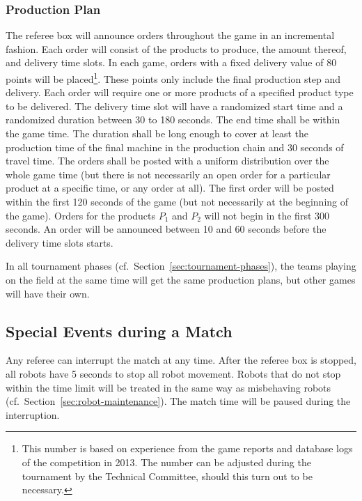 \documentclass[12pt,twoside]{article}
\newcommand{\refsec}[1]{Section~\ref{#1}}
\begin{document}
\subsubsection{Production Plan}
The referee box will announce orders throughout the game in an
incremental fashion. Each order will consist of the products to
produce, the amount thereof, and delivery time slots. In each game,
orders with a fixed delivery value of 80 points will be
placed\footnote{This number is based on experience from the game
  reports and database logs of the competition in 2013. The number can
  be adjusted during the tournament by the Technical Committee, should
  this turn out to be necessary.}. These points only include the
final production step and delivery. Each order will require one or
more products of a specified product type to be delivered. The
delivery time slot will have a randomized start time and a randomized
duration between 30 to 180 seconds. The end time shall be within the
game time. The duration shall be long enough to cover at least the
production time of the final machine in the production chain and 30
seconds of travel time. The orders shall be posted with a uniform
distribution over the whole game time (but there is not necessarily an
open order for a particular product at a specific time, or any order
at all). The first order will be posted within the first 120 seconds
of the game (but not necessarily at the beginning of the game). Orders
for the products $P_1$ and $P_2$ will not begin in the first 300
seconds. An order will be announced between 10 and 60 seconds before
the delivery time slots starts.

In all tournament phases (cf.~\refsec{sec:tournament-phases}), the
teams playing on the field at the same time will get the same
production plans, but other games will have their own.

\subsection{Special Events during a Match}
\label{sec:during-match}
Any referee can interrupt the match at any time. After the referee box
is stopped, all robots have 5 seconds to stop all robot movement.
Robots that do not stop within the time limit will be treated in the
same way as misbehaving robots (cf.~\refsec{sec:robot-maintenance}).
The match time will be paused during the interruption.
\end{document}
